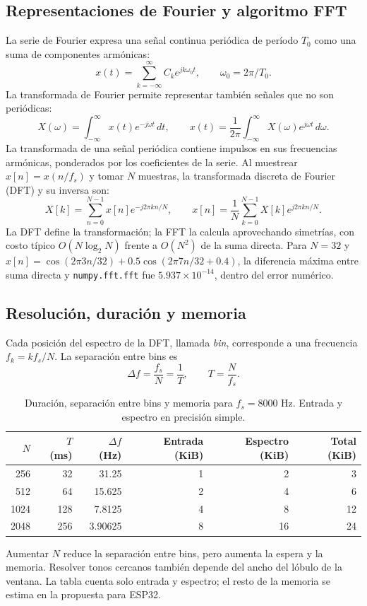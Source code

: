 \documentclass[11pt,a4paper]{article}
\newcommand{\ruta}[1]{\nolinkurl{#1}}
\begin{document}
\subsection{Representaciones de Fourier y algoritmo FFT}
La serie de Fourier expresa una señal continua periódica de período $T_0$ como una suma de componentes armónicas:
\begin{equation}
x(t)=\sum_{k=-\infty}^{\infty}C_k e^{jk\omega_0t},\qquad \omega_0=2\pi/T_0.
\end{equation}
La transformada de Fourier permite representar también señales que no son periódicas:
\begin{equation}
X(\omega)=\int_{-\infty}^{\infty}x(t)e^{-j\omega t}\,dt,\qquad
x(t)=\frac{1}{2\pi}\int_{-\infty}^{\infty}X(\omega)e^{j\omega t}\,d\omega.
\end{equation}
La transformada de una señal periódica contiene impulsos en sus frecuencias armónicas, ponderados por los coeficientes de la serie\cite{oppenheim}. Al muestrear $x[n]=x(n/f_s)$ y tomar $N$ muestras, la transformada discreta de Fourier (DFT) y su inversa son\cite{proakis}:
\begin{equation}
X[k]=\sum_{n=0}^{N-1}x[n]e^{-j2\pi kn/N},\qquad
x[n]=\frac1N\sum_{k=0}^{N-1}X[k]e^{j2\pi kn/N}.
\end{equation}
La DFT define la transformación; la FFT la calcula aprovechando simetrías, con costo típico $O(N\log_2N)$ frente a $O(N^2)$ de la suma directa. Para $N=32$ y $x[n]=\cos(2\pi3n/32)+0.5\cos(2\pi7n/32+0.4)$, la diferencia máxima entre suma directa y \ruta{numpy.fft.fft} fue $5.937\times10^{-14}$, dentro del error numérico.

\subsection{Resolución, duración y memoria}
Cada posición del espectro de la DFT, llamada \emph{bin}, corresponde a una frecuencia $f_k=kf_s/N$. La separación entre bins es
\begin{equation}
\Delta f=\frac{f_s}{N}=\frac1T,\qquad T=\frac{N}{f_s}.
\end{equation}
\begin{table}[H]\centering\caption{Duración, separación entre bins y memoria para $f_s=8000$ Hz. Entrada y espectro en precisión simple.}
\begin{tabular}{rrrrrr}\toprule
$N$ & $T$ (ms) & $\Delta f$ (Hz) & Entrada (KiB) & Espectro (KiB) & Total (KiB)\\\midrule
256&32&31.25&1&2&3\\512&64&15.625&2&4&6\\1024&128&7.8125&4&8&12\\2048&256&3.90625&8&16&24\\\bottomrule
\end{tabular}\end{table}
Aumentar $N$ reduce la separación entre bins, pero aumenta la espera y la memoria. Resolver tonos cercanos también depende del ancho del lóbulo de la ventana. La tabla cuenta solo entrada y espectro; el resto de la memoria se estima en la propuesta para ESP32.
\end{document}

